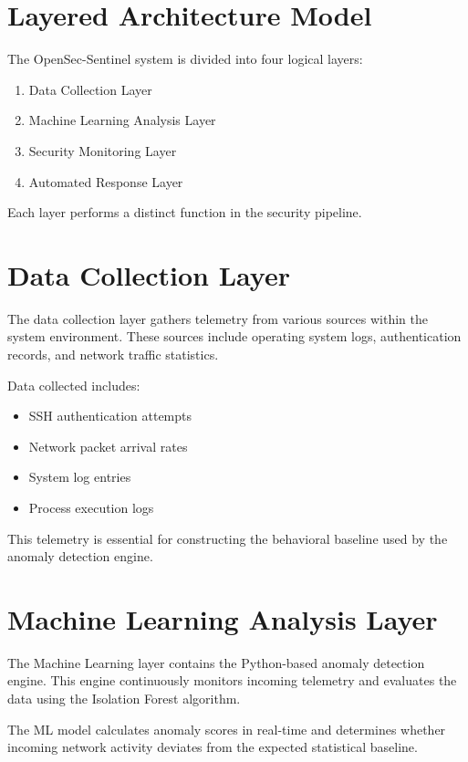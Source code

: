 \documentclass[12pt, a4paper]{report}
\begin{document}
	\section{Layered Architecture Model}
	
	The OpenSec-Sentinel system is divided into four logical layers:
	
	\begin{enumerate}
		\item Data Collection Layer
		\item Machine Learning Analysis Layer
		\item Security Monitoring Layer
		\item Automated Response Layer
	\end{enumerate}
	
	Each layer performs a distinct function in the security pipeline.
	
	\section{Data Collection Layer}
	
	The data collection layer gathers telemetry from various sources within the
	system environment. These sources include operating system logs, authentication
	records, and network traffic statistics.
	
	Data collected includes:
	
	\begin{itemize}
		\item SSH authentication attempts
		\item Network packet arrival rates
		\item System log entries
		\item Process execution logs
	\end{itemize}
	
	This telemetry is essential for constructing the behavioral baseline used by
	the anomaly detection engine.
	
	\section{Machine Learning Analysis Layer}
	
	The Machine Learning layer contains the Python-based anomaly detection engine.
	This engine continuously monitors incoming telemetry and evaluates the data
	using the Isolation Forest algorithm.
	
	The ML model calculates anomaly scores in real-time and determines whether
	incoming network activity deviates from the expected statistical baseline.
	
\end{document}
